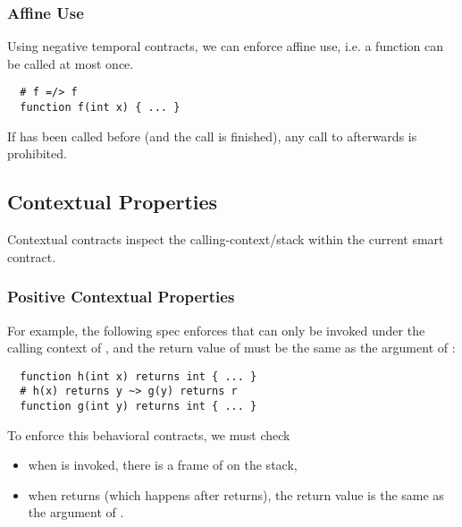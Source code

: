 \subsubsection*{Affine Use}

Using negative temporal contracts, we can enforce affine use, i.e.
a function can be called at most once.
\begin{lstlisting}
  # f =/> f
  function f(int x) { ... }
\end{lstlisting}
If  has been called before (and the call is finished), any
call to  afterwards is prohibited.



\subsection{Contextual Properties}

Contextual contracts inspect the calling-context/stack within the
current smart contract.


\subsubsection{Positive Contextual Properties}

For example, the following spec enforces that  can only be invoked
under the calling context of , and the return value of  must be
the same as the argument of :

\begin{lstlisting}
  function h(int x) returns int { ... }
  # h(x) returns y ~> g(y) returns r
  function g(int y) returns int { ... }
\end{lstlisting}

To enforce this behavioral contracts, we must check
\begin{itemize}
	\item when  is invoked, there is a frame of  on the stack,
	\item when  returns (which happens after  returns), the return value
	      is the same as the argument of .
\end{itemize}

